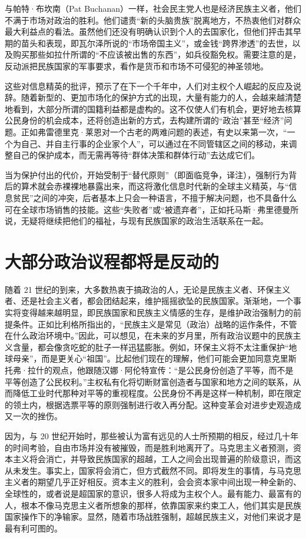 与帕特·布坎南（Pat Buchanan）一样，社会民主党人也是经济民族主义者，他们不满于市场对政治的胜利。他们谴责“新的头脑贵族”脱离地方，不热衷他们对群众最大利益点的看法。虽然他们还没有明确认识到个人的去国家化，但他们抨击其早期的苗头和表现，即瓦尔泽所说的“市场帝国主义”，或金钱“跨界渗透”的去世，以及购买那些如拉什所谓的“不应该被出售的东西”，如兵役豁免权。需要注意的是，反动派把民族国家的军事要求，看作是货币和市场不可侵犯的神圣领地。

这些对信息精英的批评，预示了在下一个千年中，人们对主权个人崛起的反应及说辞。随着新型的、更加市场化的保护方式的出现，大量有能力的人，会越来越清楚地看到，大部分所谓的国籍利益都是虚构的。这不仅使人们有机会，更好地去核算公民身份的机会成本，还将创造出新的方式，去构建所谓的“政治”甚至“经济”问题。正如弗雷德里克·莱恩对一个古老的两难问题的表述，有史以来第一次，“一个为自己、并自主行事的企业家个人”，可以通过在不同管辖区之间的移动，来调整自己的保护成本，而无需再等待“群体决策和群体行动”去达成它们。

当为保护付出的代价，开始受制于“替代原则”（即面临竞争，译注），强制行为背后的算术就会赤裸裸地暴露出来，而这将激化信息时代新的全球主义精英，与“信息贫民”之间的冲突，后者基本上只会一种语言，不擅于解决问题，也不具备什么可在全球市场销售的技能。这些“失败者”或“被遗弃者”，正如托马斯·弗里德曼所说，无疑将继续把他们的福祉，与现有民族国家的政治生活联系在一起。

\section{大部分政治议程都将是反动的}
随着 21 世纪的到来，大多数热衷于搞政治的人，无论是民族主义者、环保主义者、还是社会主义者，都会团结起来，维护摇摇欲坠的民族国家。渐渐地，一个事实将变得越来越明显，即民族国家和民族主义情感的生存，是维护政治强制力的前提条件。正如比利格所指出的，“民族主义是常见（政治）战略的运作条件，不管在什么政治环境中。”因此，可以想见，在未来的岁月里，所有政治议题中的民族主义含量，都会像贪吃蛇的肚子一样迅猛膨胀。例如，环保主义将不太注重保护“地球母亲”，而是更关心“祖国”。比起他们现在的理解，他们可能会更加同意克里斯托弗·拉什的观点，他跟随汉娜·阿伦特宣传：“是公民身份创造了平等，而不是平等创造了公民权利。”主权私有化将切断财富创造者与国家和地方之间的联系，从而降低工业时代那种对平等的重视程度。公民身份不再是这样一种机制，即在限定的领土内，根据选票平等的原则强制进行收入再分配。这种变革会对进步史观造成又一次的挫伤。

因为，与 20 世纪开始时，那些被认为富有远见的人士所预期的相反，经过几十年的时间考验，自由市场并没有被摧毁，而是胜利地离开了。马克思主义者预测，资本主义将会消亡，并导致民族国家的超越，工人之间会出现普遍的阶级意识，而这从未发生。事实上，国家将会消亡，但方式截然不同。即将发生的事情，与马克思主义者的期望几乎正好相反。资本主义的胜利，会会资本家中间出现一种全新的、全球性的，或者说是超国家的意识，很多人将成为主权个人。最有能力、最富有的人，根本不像马克思主义者所想象的那样，依靠国家来约束工人，他们其实是民族国家操作下的净输家。显然，随着市场战胜强制，超越民族主义，对他们来说才是最有利可图的。

